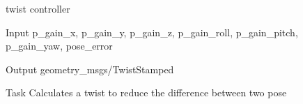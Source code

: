 \begin{frame}{twist controller}
	\begin{alertblock}{Input}
	p\_gain\_x, p\_gain\_y, p\_gain\_z, p\_gain\_roll, p\_gain\_pitch, p\_gain\_yaw, pose\_error
    \end{alertblock}
    
    \begin{alertblock}{Output}
	geometry\_msgs/TwistStamped
    \end{alertblock}
    
    \begin{alertblock}{Task}
   Calculates a twist to reduce the difference between two pose
    \end{alertblock}
\end{frame}

